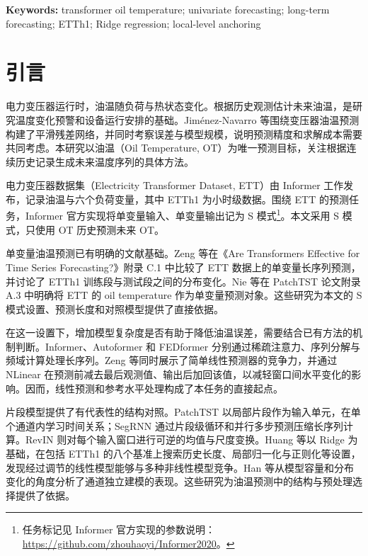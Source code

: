 \documentclass[UTF8,a4paper,11pt,fontset=windows]{ctexart}
\begin{document}
\vspace{0.5em}
\noindent\textbf{Keywords:} transformer oil temperature; univariate forecasting; long-term forecasting; ETTh1; Ridge regression; local-level anchoring

\section{引言}
电力变压器运行时，油温随负荷与热状态变化。根据历史观测估计未来油温，是研究温度变化预警和设备运行安排的基础。Jiménez-Navarro 等围绕变压器油温预测构建了平滑残差网络，并同时考察误差与模型规模，说明预测精度和求解成本需要共同考虑\cite{jimenez2023oil}。本研究以油温（Oil Temperature, OT）为唯一预测目标，关注根据连续历史记录生成未来温度序列的具体方法。

电力变压器数据集（Electricity Transformer Dataset, ETT）由 Informer 工作发布，记录油温与六个负荷变量，其中 ETTh1 为小时级数据\cite{informer2021,etdataset2021}。围绕 ETT 的预测任务，Informer 官方实现将单变量输入、单变量输出记为 S 模式\footnote{任务标记见 Informer 官方实现的参数说明：\url{https://github.com/zhouhaoyi/Informer2020}。}。本文采用 S 模式，只使用 OT 历史预测未来 OT。

单变量油温预测已有明确的文献基础。Zeng 等在《Are Transformers Effective for Time Series Forecasting?》附录 C.1 中比较了 ETT 数据上的单变量长序列预测，并讨论了 ETTh1 训练段与测试段之间的分布变化\cite{dlinear2023}。Nie 等在 PatchTST 论文附录 A.3 中明确将 ETT 的 oil temperature 作为单变量预测对象\cite{patchtst2023}。这些研究为本文的 S 模式设置、预测长度和对照模型提供了直接依据。

在这一设置下，增加模型复杂度是否有助于降低油温误差，需要结合已有方法的机制判断。Informer、Autoformer 和 FEDformer 分别通过稀疏注意力、序列分解与频域计算处理长序列\cite{informer2021,autoformer2021,fedformer2022}。Zeng 等同时展示了简单线性预测器的竞争力，并通过 NLinear 在预测前减去最后观测值、输出后加回该值，以减轻窗口间水平变化的影响\cite{dlinear2023}。因而，线性预测和参考水平处理构成了本任务的直接起点。

片段模型提供了有代表性的结构对照。PatchTST 以局部片段作为输入单元，在单个通道内学习时间关系\cite{patchtst2023}；SegRNN 通过片段级循环和并行多步预测压缩长序列计算\cite{segrnn2023}。RevIN 则对每个输入窗口进行可逆的均值与尺度变换\cite{revin2022}。Huang 等以 Ridge 为基础，在包括 ETTh1 的八个基准上搜索历史长度、局部归一化与正则化等设置，发现经过调节的线性模型能够与多种非线性模型竞争\cite{huang2026linear}。Han 等从模型容量和分布变化的角度分析了通道独立建模的表现\cite{ci2023}。这些研究为油温预测中的结构与预处理选择提供了依据。
\end{document}
